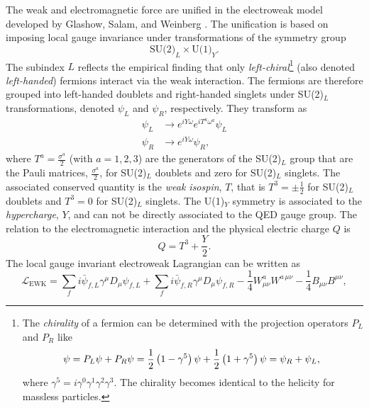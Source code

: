 The weak and electromagnetic force are unified in the electroweak model developed by Glashow, Salam, and Weinberg .
The unification is based on imposing local gauge invariance under transformations of the symmetry group
\begin{equation}
  \text{SU(2)}_L \times \text{U(1)}_Y.
\end{equation}
The subindex $L$ reflects the empirical finding that only \emph{left-chiral}\footnote{
  The \emph{chirality} of a fermion can be determined with the projection operators $P_L$ and $P_R$ like
  \begin{equation*}
    \psi       = P_L \psi + P_R \psi = \frac{1}{2} \left( 1 - \gamma^5 \right) \psi + \frac{1}{2} \left( 1 + \gamma^5 \right) \psi = \psi_R + \psi_L,                                \\
  \end{equation*}
  where $\gamma^5 = i\gamma^0\gamma^1\gamma^2\gamma^3$. The chirality becomes identical to the helicity for massless particles.
} (also denoted \emph{left-handed}) fermions interact via the weak interaction.
The fermions are therefore grouped into left-handed doublets and right-handed singlets under SU(2)$_L$ transformations, denoted $\psi_L$ and $\psi_R$, respectively. They transform as
\begin{align}
  \psi_L & \rightarrow e^{iY\omega} e^{iT^a\omega^a} \psi_L \\
  \psi_R & \rightarrow e^{iY\omega} \psi_R,
\end{align}
where $T^a = \frac{\sigma^a}{2}$ (with $a = 1, 2, 3$) are the generators of the SU(2)$_L$ group that are the Pauli matrices, $\frac{\sigma^a}{2}$, for SU(2)$_L$ doublets and zero for SU(2)$_L$ singlets. 
The associated conserved quantity is the \emph{weak isospin}, $T$, that is $T^3 = \pm \frac{1}{2}$ for SU(2)$_L$ doublets and $T^3 = 0$ for SU(2)$_L$ singlets.
The U(1)$_Y$ symmetry is associated to the \emph{hypercharge}, $Y$, and can not be directly associated to the QED gauge group.
The relation to the electromagnetic interaction and the physical electric charge $Q$ is
\begin{equation}
  Q = T^3 + \frac{Y}{2}.
\end{equation}
The local gauge invariant electroweak Lagrangian can be written as
\begin{equation}
  \mathcal{L}_{\text{EWK}} = \sum_f i\bar{\psi}_{f, L}\gamma^\mu D_\mu \psi_{f, L} + \sum_f i\bar{\psi}_{f, R}\gamma^\mu D_\mu \psi_{f, R} - \frac{1}{4}W_{\mu\nu}^aW^{a\,\mu\nu} - \frac{1}{4} B_{\mu\nu}B^{\mu\nu}, 
  \label{eq:lagrangianewk}
\end{equation}
